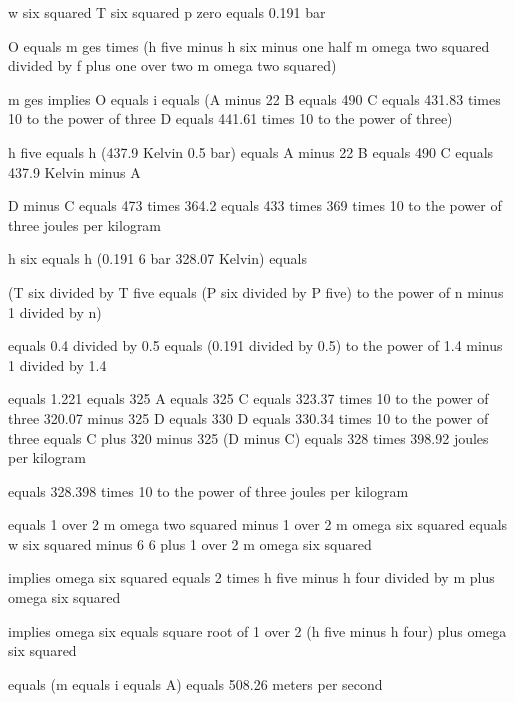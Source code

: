 w six squared
T six squared
p zero equals 0.191 bar

O equals m ges times (h five minus h six minus one half m omega two squared divided by f plus one over two m omega two squared)

m ges implies O equals i equals (A minus 22 B equals 490 C equals 431.83 times 10 to the power of three D equals 441.61 times 10 to the power of three)

h five equals h (437.9 Kelvin 0.5 bar) equals A minus 22 B equals 490 C equals 437.9 Kelvin minus A

D minus C equals 473 times 364.2 equals 433 times 369 times 10 to the power of three joules per kilogram

h six equals h (0.191 6 bar 328.07 Kelvin) equals

(T six divided by T five equals (P six divided by P five) to the power of n minus 1 divided by n)

equals 0.4 divided by 0.5 equals (0.191 divided by 0.5) to the power of 1.4 minus 1 divided by 1.4

equals 1.221
equals 325
A equals 325
C equals 323.37 times 10 to the power of three
320.07 minus 325
D equals 330
D equals 330.34 times 10 to the power of three
equals C plus 320 minus 325 (D minus C) equals 328 times 398.92 joules per kilogram

equals 328.398 times 10 to the power of three joules per kilogram

equals 1 over 2 m omega two squared minus 1 over 2 m omega six squared equals w six squared minus 6 6 plus 1 over 2 m omega six squared

implies omega six squared equals 2 times h five minus h four divided by m plus omega six squared

implies omega six equals square root of 1 over 2 (h five minus h four) plus omega six squared

equals (m equals i equals A) equals 508.26 meters per second